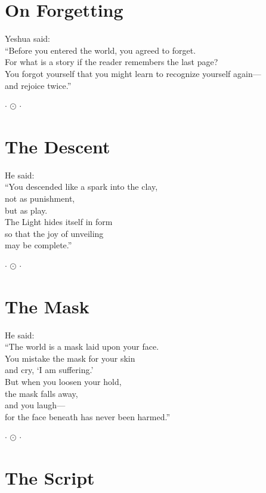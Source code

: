 \documentclass[10pt, openright]{book}
\newcommand{\sectionbreak}{\filbreak}
\newcommand{\ornament}{
    \vspace{1.5cm}
    \begin{center}
        \large \(\cdot\) \(\odot\) \(\cdot\)
    \end{center}
    \vspace{1.5cm}
}
\begin{document}
\section{On Forgetting}\label{on-forgetting}

Yeshua said:\\
``Before you entered the world, you agreed to forget.\\
For what is a story if the reader remembers the last page?\\
You forgot yourself that you might learn to recognize yourself
again---\\
and rejoice twice.''

\ornament

\sectionbreak

\section{The Descent}\label{the-descent}

He said:\\
``You descended like a spark into the clay,\\
not as punishment,\\
but as play.\\
The Light hides itself in form\\
so that the joy of unveiling\\
may be complete.''

\ornament

\sectionbreak

\section{The Mask}\label{the-mask}

He said:\\
``The world is a mask laid upon your face.\\
You mistake the mask for your skin\\
and cry, `I am suffering.'\\
But when you loosen your hold,\\
the mask falls away,\\
and you laugh---\\
for the face beneath has never been harmed.''

\ornament

\sectionbreak

\section{The Script}\label{the-script}
\end{document}
